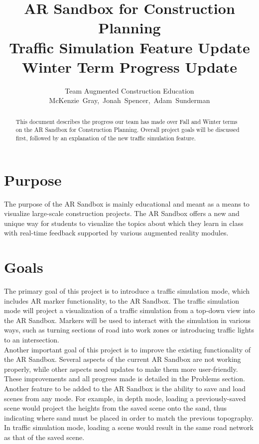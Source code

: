 \documentclass[letterpaper, 10pt, onecolumn, draftclsnofoot]{IEEEtran}
\title{\Large{\textbf{AR Sandbox for Construction Planning \\
                      Traffic Simulation Feature Update \\ 
                      \large{Winter Term Progress Update}}} \\
                      \vspace{15pt}}
\author{Team Augmented Construction Education \\
       McKenzie~Gray,~Jonah~Spencer,~Adam~Sunderman}
\begin{document}
\maketitle
\vspace{100pt}

\begin{abstract}
    This document describes the progress our team has made over Fall and Winter terms on the AR Sandbox for Construction Planning. Overall project goals will be discussed first, followed by an explanation of the new traffic simulation feature.    
\end{abstract}

\newpage
\tableofcontents
\clearpage
\newpage

\section{Purpose}
    The purpose of the AR Sandbox is mainly educational and meant as a means to visualize large-scale construction projects. The AR Sandbox offers a new and unique way for students to visualize the topics about which they learn in class with real-time feedback supported by various augmented reality modules.

\section{Goals}
    The primary goal of this project is to introduce a traffic simulation mode, which includes AR marker functionality, to the AR Sandbox. The traffic simulation mode will project a visualization of a traffic simulation from a top-down view into the AR Sandbox. Markers will be used to interact with the simulation in various ways, such as turning sections of road into work zones or introducing traffic lights to an intersection.\\
    
    Another important goal of this project is to improve the existing functionality of the AR Sandbox. Several aspects of the current AR Sandbox are not working properly, while other aspects need updates to make them more user-friendly. These improvements and all progress made is detailed in the Problems section.\\
    
    Another feature to be added to the AR Sandbox is the ability to save and load scenes from any mode. For example, in depth mode, loading a previously-saved scene would project the heights from the saved scene onto the sand, thus indicating where sand must be placed in order to match the previous topography. In traffic simulation mode, loading a scene would result in the same road network as that of the saved scene.
\end{document}
